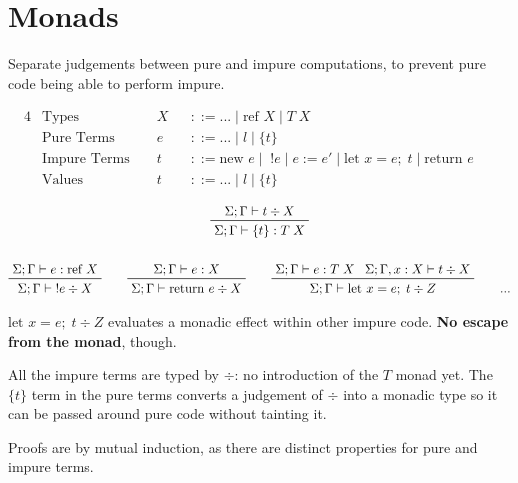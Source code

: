 \documentclass[a4paper,11pt]{article}
\begin{document}
\section{Monads}
{
    Separate judgements between pure and impure computations, to prevent pure code being able to perform impure.

    \begin{alignat*}{4}
    &\text{Types } &&X &&::= ... \mid \text{ref }X \mid T\;X && \\
    &\text{Pure Terms } &&e &&::= ... \mid l \mid \{t\} && \\
    &\text{Impure Terms } &&t &&::= \text{new }e \mid \;!e \mid e:=e' \mid \text{let }x=e;\;t \mid \text{return }e && \\
    &\text{Values } &&t &&::= ... \mid l \mid \{t\} &&
    \end{alignat*}

    \begin{gather*}
    \prftree[r]{}
    {\Sigma;\Gamma\vdash t \div X}
    {\Sigma;\Gamma\vdash \{t\} : T\;X}
    \\
    \\
    \prftree[r]{}
    {\Sigma;\Gamma\vdash e : \text{ref }X}
    {\Sigma;\Gamma\vdash \;!e \div X}
    \qquad
    \prftree[r]{}
    {\Sigma;\Gamma\vdash e : X}
    {\Sigma;\Gamma\vdash \text{return }e \div X}
    \qquad
    \prftree[r]{}
    {\Sigma;\Gamma\vdash e : T\;X}
    {\Sigma;\Gamma,x:X \vdash t \div X}
    {\Sigma;\Gamma\vdash\text{let }x=e;\;t\div Z}
    \qquad
    ...
    \end{gather*}

    \(\text{let }x=e;\;t\div Z\) evaluates a monadic effect within other impure code. \textbf{No escape from the monad},
    though.

    All the impure terms are typed by \(\div\): no introduction of the \(T\) monad yet. The \(\{t\}\) term in the pure
    terms converts a judgement of \(\div\) into a monadic type so it can be passed around pure code without tainting it.

    Proofs are by mutual induction, as there are distinct properties for pure and impure terms.
}
\end{document}
